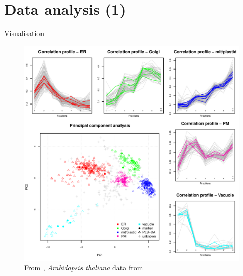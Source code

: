 \documentclass{beamer}
\theoremstyle{example}
\begin{document}

\section{Data analysis (1)}


\begin{frame}{Visualisation}
  \begin{figure}
    \centering
    \includegraphics[width=.6\linewidth]{figs/F04-analyses.pdf}
    \caption{From \cite{Gatto:2010}, \textit{Arabidopsis thaliana} data
      from \cite{Dunkley:2006}}
  \end{figure}
\end{frame}
\end{document}
